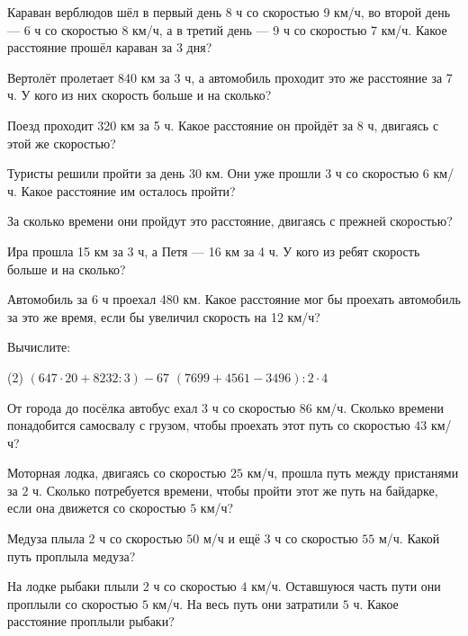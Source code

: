 \begin{class}[number=2]
	\begin{listofex}
			\item Караван верблюдов шёл в первый день 8 ч со скоростью 9 км/ч, во второй день --- 6 ч со скоростью 8 км/ч, а в третий день --- 9 ч со скоростью 7 км/ч. Какое расстояние прошёл караван за 3 дня?
		\item Вертолёт пролетает 840 км за 3 ч, а автомобиль проходит это же расстояние за 7 ч. У кого из них скорость больше и на сколько?
		\item Поезд проходит 320 км за 5 ч. Какое расстояние он пройдёт за 8 ч, двигаясь с этой же скоростью?
		\item Туристы решили пройти за день 30 км. Они уже прошли 3 ч со скоростью 6 км/ч. Какое расстояние им осталось пройти?
		\item За сколько времени они пройдут это расстояние, двигаясь с прежней скоростью?
		\item Ира прошла 15 км за 3 ч, а Петя --- 16 км за 4 ч. У кого из ребят скорость больше и на сколько?
		\item Автомобиль за 6 ч проехал 480 км. Какое расстояние мог бы проехать автомобиль за это же время, если бы увеличил скорость на 12 км/ч?
	\end{listofex}
\end{class}

\begin{homework}[number=1]
	\begin{listofex}
		\item Вычислите:
		\begin{tasks}(2)
			\task \( (647\cdot 20 + 8232 : 3 ) - 67\)
			\task \( ( 7699 + 4561 - 3496 ) : 2 \cdot 4 \)
		\end{tasks}
		\item От города до посёлка автобус ехал \( 3 \) ч со скоростью \( 86 \) км/ч. Сколько времени понадобится самосвалу с грузом, чтобы проехать этот путь со скоростью \( 43 \) км/ч?
		\item Моторная лодка, двигаясь со скоростью \( 25 \) км/ч, прошла путь между пристанями за \( 2 \) ч. Сколько потребуется времени, чтобы пройти этот же путь на байдарке, если она движется со скоростью \( 5 \) км/ч?
		\item  Медуза плыла \( 2 \) ч со скоростью \( 50 \) м/ч и ещё \( 3 \) ч со скоростью \( 55 \) м/ч. Какой путь проплыла медуза?
		\item На лодке рыбаки плыли \( 2 \) ч со скоростью \( 4 \) км/ч. Оставшуюся часть пути они проплыли со скоростью \( 5 \) км/ч. На весь путь они затратили \( 5 \) ч. Какое расстояние проплыли рыбаки?
	\end{listofex}
\end{homework}

